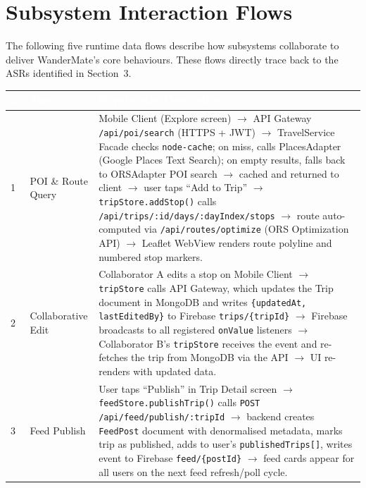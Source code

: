 \documentclass[12pt, a4paper]{article}
\newcommand{\thcell}[1]{\textcolor{white}{\textbf{\small #1}}}
\begin{document}
\section{Subsystem Interaction Flows}

The following five runtime data flows describe how subsystems collaborate to deliver WanderMate's core behaviours. These flows directly trace back to the ASRs identified in Section~3.

\vspace{0.6em}
\begin{longtable}{C{0.5cm} L{3.0cm} L{10.2cm}}
\toprule
{}
\thcell{\#} & \thcell{Flow} & \thcell{Step-by-step Description} \\
\midrule
\endhead
\bottomrule
\endfoot

1 & POI \& Route Query &
Mobile Client (Explore screen) $\rightarrow$ API Gateway \texttt{/api/poi/search} (HTTPS + JWT) $\rightarrow$ TravelService Facade checks \texttt{node-cache}; on miss, calls PlacesAdapter (Google Places Text Search); on empty results, falls back to ORSAdapter POI search $\rightarrow$ cached and returned to client $\rightarrow$ user taps ``Add to Trip'' $\rightarrow$ \texttt{tripStore.addStop()} calls \texttt{/api/trips/:id/days/:dayIndex/stops} $\rightarrow$ route auto-computed via \texttt{/api/routes/optimize} (ORS Optimization API) $\rightarrow$ Leaflet WebView renders route polyline and numbered stop markers. \\

2 & Collaborative Edit &
Collaborator A edits a stop on Mobile Client $\rightarrow$ \texttt{tripStore} calls API Gateway, which updates the Trip document in MongoDB and writes \texttt{\{updatedAt, lastEditedBy\}} to Firebase \texttt{trips/\{tripId\}} $\rightarrow$ Firebase broadcasts to all registered \texttt{onValue} listeners $\rightarrow$ Collaborator B's \texttt{tripStore} receives the event and re-fetches the trip from MongoDB via the API $\rightarrow$ UI re-renders with updated data. \\

3 & Feed Publish &
User taps ``Publish'' in Trip Detail screen $\rightarrow$ \texttt{feedStore.publishTrip()} calls \texttt{POST /api/feed/publish/:tripId} $\rightarrow$ backend creates \texttt{FeedPost} document with denormalised metadata, marks trip as published, adds to user's \texttt{publishedTrips[]}, writes event to Firebase \texttt{feed/\{postId\}} $\rightarrow$ feed cards appear for all users on the next feed refresh/poll cycle. \\


\end{longtable}
\end{document}
